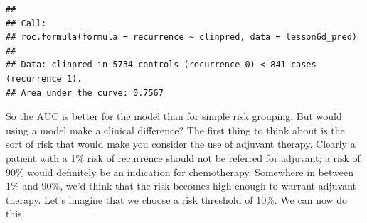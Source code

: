 \documentclass[]{book}
\newenvironment{Shaded}{\begin{snugshade}}{\end{snugshade}}
\newcommand{\CommentTok}[1]{\textcolor[rgb]{0.56,0.35,0.01}{\textit{#1}}}
\newcommand{\DataTypeTok}[1]{\textcolor[rgb]{0.13,0.29,0.53}{#1}}
\newcommand{\KeywordTok}[1]{\textcolor[rgb]{0.13,0.29,0.53}{\textbf{#1}}}
\newcommand{\NormalTok}[1]{#1}
\newcommand{\OperatorTok}[1]{\textcolor[rgb]{0.81,0.36,0.00}{\textbf{#1}}}
\newcommand{\StringTok}[1]{\textcolor[rgb]{0.31,0.60,0.02}{#1}}
\begin{document}
\begin{Shaded}
\end{Shaded}

\begin{verbatim}
## 
## Call:
## roc.formula(formula = recurrence ~ clinpred, data = lesson6d_pred)
## 
## Data: clinpred in 5734 controls (recurrence 0) < 841 cases (recurrence 1).
## Area under the curve: 0.7567
\end{verbatim}

So the AUC is better for the model than for simple risk grouping. But
would using a model make a clinical difference? The first thing to think
about is the sort of risk that would make you consider the use of
adjuvant therapy. Clearly a patient with a 1\% risk of recurrence should
not be referred for adjuvant; a risk of 90\% would definitely be an
indication for chemotherapy. Somewhere in between 1\% and 90\%, we'd
think that the risk becomes high enough to warrant adjuvant therapy.
Let's imagine that we choose a risk threshold of 10\%. We can now do
this.
\end{document}
